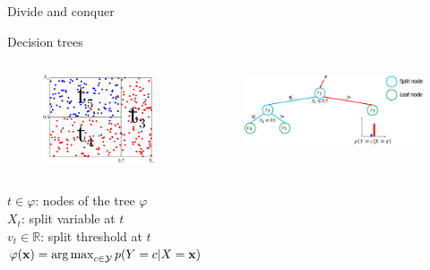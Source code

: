 \documentclass{beamer}
\DeclareMathOperator*{\argmax}{arg\,max}
\begin{document}
\begin{frame}{Divide and conquer}
\begin{figure}
\end{figure}
\end{frame}

\begin{frame}{Decision trees}
\begin{columns}
\begin{column}{0.3\textwidth}
\begin{figure}
\includegraphics[width=\textwidth]{./figures/tree-partition-d.pdf}
\end{figure}
\end{column}
\begin{column}{0.7\textwidth}
\begin{figure}
\includegraphics[width=\textwidth]{./figures/tree-simple.pdf}
\end{figure}
\end{column}
\end{columns}

\vspace{1cm}

$t \in \varphi$: nodes of the tree $\varphi$\\
$X_t$: split variable at $t$ \\
$v_t \in \mathbb{R}$: split threshold at $t$\\
$\varphi(\mathbf{x}) = \argmax_{c \in {\cal Y}} p(Y = c | X = \mathbf{x})$
\end{frame}
\end{document}
